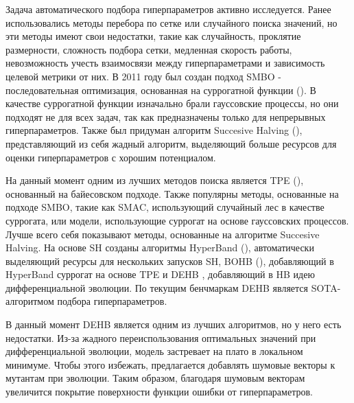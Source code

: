 \documentclass{article}
\begin{document}
Задача автоматического подбора гиперпараметров активно исследуется. Ранее использовались методы перебора по сетке или случайного поиска значений, но эти методы имеют свои недостатки, такие как случайность, проклятие размерности, сложность подбора сетки, медленная скорость работы, невозможность учесть взаимосвязи между гиперпараметрами и зависимость целевой метрики от них. В 2011 году был создан подход SMBO - последовательная оптимизация, основанная на суррогатной функции (\cite{10.1007/978-3-642-25566-3_40}). В качестве суррогатной функции изначально брали гауссовские процессы, но они подходят не для всех задач, так как предназначены только для непрерывных гиперпараметров. Также был придуман алгоритм Succesive Halving (\cite{jamieson2015nonstochastic}), представляющий из себя жадный алгоритм, выделяющий больше ресурсов для оценки гиперпараметров с хорошим потенциалом.

На данный момент одним из лучших методов поиска является TPE (\cite{NIPS2011_86e8f7ab}), основанный на байесовском подходе. Также популярны методы, основанные на подходе SMBO, такие как SMAC, использующий случайный лес в качестве суррогата, или модели, использующие суррогат на основе гауссовских процессов. Лучше всего себя показывают методы, основанные на алгоритме Succesive Halving. На основе SH созданы алгоритмы HyperBand (\cite{li2018hyperband}), автоматически выделяющий ресурсы для нескольких запусков SH, BOHB (\cite{falkner2018bohb}), добавляющий в HyperBand суррогат на основе TPE и DEHB \cite{awad2021dehb}, добавляющий в HB идею дифференциальной эволюции. По текущим бенчмаркам DEHB является SOTA-алгоритмом подбора гиперпараметров.

В данный момент DEHB является одним из лучших алгоритмов, но у него есть недостатки. Из-за жадного переиспользования оптимальных значений при дифференциальной эволюции, модель застревает на плато в локальном минимуме. Чтобы этого избежать, предлагается добавлять шумовые векторы к мутантам при эволюции. Таким образом, благодаря шумовым векторам увеличится покрытие поверхности функции ошибки от гиперпараметров.
\end{document}
